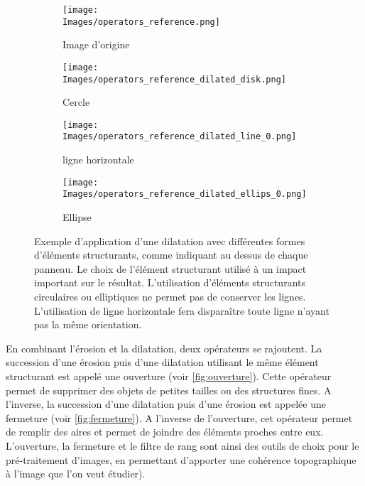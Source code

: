 \documentclass[\main/main.tex]{subfiles}
\providecommand{\Images}{\main/Figures/intro_seg}
\begin{document}
\begin{figure}[h]
    \centering
    \begin{subfigure}[b]{0.45\textwidth}
       \caption{
       Image d'origine
            }
       \centering \texttt{[image: \\Images/operators\_reference.png]}
    \end{subfigure}
    \begin{subfigure}[b]{0.45\textwidth}
       \caption{
       Cercle
            }
       \centering \texttt{[image: \\Images/operators\_reference\_dilated\_disk.png]}
    \end{subfigure}
    \begin{subfigure}[b]{0.45\textwidth}
       \caption{
       ligne horizontale
            }
       \centering \texttt{[image: \\Images/operators\_reference\_dilated\_line\_0.png]}
    \end{subfigure}
    \begin{subfigure}[b]{0.45\textwidth}
       \caption{
       Ellipse
            }
       \centering \texttt{[image: \\Images/operators\_reference\_dilated\_ellips\_0.png]}
    \end{subfigure}
    \caption{
        \label{fig:morpho:operateurs}
        Exemple d'application d'une dilatation avec différentes formes d'éléments structurants, comme indiquant au dessus de chaque panneau.
        \newline
        Le choix de l'élément structurant utilisé à un impact important sur le résultat.
        L'utilisation d'éléments structurants circulaires ou elliptiques ne permet pas de conserver les lignes.
        L'utilisation de ligne horizontale fera disparaître toute ligne n'ayant pas la même orientation.
    }
    
\end{figure}
%
%
En combinant l'érosion et la dilatation, deux opérateurs se rajoutent.
%
La succession d'une érosion puis d'une dilatation utilisant le même élément structurant
est appelé une ouverture
(voir \autoref{fig:ouverture}).
%
Cette opérateur permet de supprimer des objets de petites tailles ou des structures fines.
%
A l'inverse, la succession d'une dilatation puis d'une érosion est appelée une fermeture
(voir \autoref{fig:fermeture}).
%
A l'inverse de l'ouverture, cet opérateur permet de remplir des aires et permet de joindre des éléments proches entre eux.
%
L'ouverture, la fermeture et le filtre de rang sont ainsi des outils de choix pour le pré\hyp{}traitement d'images, en permettant d'apporter une cohérence topographique à l'image que l'on veut étudier).
\end{document}

